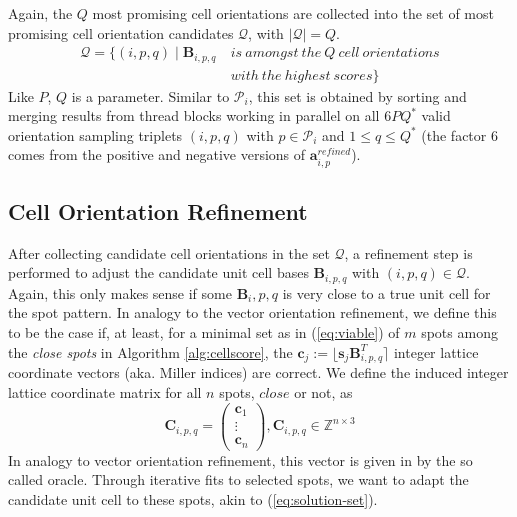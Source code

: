 \documentclass[a4paper,10pt]{article}
\newcommand{\vect}[1]{\mathbf{#1}}
\newcommand{\mat}[1]{\mathbf{#1}}
\newcommand{\round}[1]{\lfloor #1 \rceil}
\begin{document}
Again, the $Q$ most promising cell orientations are collected into the set of most promising cell orientation candidates $\mathcal{Q}$, with $|\mathcal{Q}|=Q$.
%
\[
\begin{split}
\mathcal{Q} = \{ (i,p,q) \mid \mat{B}_{i,p,q}\ &is\ amongst\ the\ Q\ cell\ orientations \\
                                               &with\ the\ highest\ scores \}
\end{split}
\]
%
Like $P$, $Q$ is a parameter. Similar to $\mathcal{P}_i$, this set is obtained by sorting and merging results from thread blocks working in parallel on all $6PQ^*$ valid orientation sampling triplets $(i,p,q)$ with $p\in \mathcal{P}_i$ and $1\leq q\leq Q^*$ (the factor 6 comes from the positive and negative versions of $\vect{a}_{i,p}^{refined}$).

\subsection{Cell Orientation Refinement}

After collecting candidate cell orientations in the set $\mathcal{Q}$, a refinement step is performed to adjust the candidate unit cell bases $\mat{B}_{i,p,q}$ with $(i,p,q)\in \mathcal{Q}$. Again, this only makes sense if some $\mat{B}_i,p,q$ is very close to a true unit cell for the spot pattern. In analogy to the vector orientation refinement, we define this to be the case if, at least, for a minimal set as in (\ref{eq:viable}) of $m$ spots among the \emph{close spots} in Algorithm \ref{alg:cellscore}, the $\vect{c}_j := \round{\vect{s}_j\mat{B}_{i,p,q}^T}$ integer lattice coordinate vectors (aka. Miller indices) are correct. We define the induced integer lattice coordinate matrix for all $n$ spots, $close$ or not, as
%
\[
 \mat{C}_{i,p,q} = \begin{pmatrix} \vect{c}_1 \\ \vdots \\ \vect{c}_n \end{pmatrix}, \mat{C}_{i,p,q}\in \mathbb{Z}^{n\times 3}
\]
%
In analogy to vector orientation refinement, this vector is given in \cite{toro-indexer} by the so called oracle. Through iterative fits to selected spots, we want to adapt the candidate unit cell to these spots, akin to (\ref{eq:solution-set}).
\end{document}
